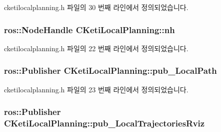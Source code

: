 cketilocalplanning.\+h 파일의 30 번째 라인에서 정의되었습니다.

\subsubsection[{\texorpdfstring{nh}{nh}}]{\setlength{\rightskip}{0pt plus 5cm}ros\+::\+Node\+Handle C\+Keti\+Local\+Planning\+::nh\hspace{0.3cm}{\ttfamily [protected]}}\hypertarget{class_c_keti_local_planning_a39a260e89fa7805f6c0c7112c91cb847}{}\label{class_c_keti_local_planning_a39a260e89fa7805f6c0c7112c91cb847}


cketilocalplanning.\+h 파일의 22 번째 라인에서 정의되었습니다.

\subsubsection[{\texorpdfstring{pub\+\_\+\+Local\+Path}{pub_LocalPath}}]{\setlength{\rightskip}{0pt plus 5cm}ros\+::\+Publisher C\+Keti\+Local\+Planning\+::pub\+\_\+\+Local\+Path\hspace{0.3cm}{\ttfamily [protected]}}\hypertarget{class_c_keti_local_planning_a42f394ae6069296e6f412eb5daa9dd3a}{}\label{class_c_keti_local_planning_a42f394ae6069296e6f412eb5daa9dd3a}


cketilocalplanning.\+h 파일의 23 번째 라인에서 정의되었습니다.

\subsubsection[{\texorpdfstring{pub\+\_\+\+Local\+Trajectories\+Rviz}{pub_LocalTrajectoriesRviz}}]{\setlength{\rightskip}{0pt plus 5cm}ros\+::\+Publisher C\+Keti\+Local\+Planning\+::pub\+\_\+\+Local\+Trajectories\+Rviz\hspace{0.3cm}{\ttfamily [protected]}}\hypertarget{class_c_keti_local_planning_a423ed1137dde91f12793bdcacb4e0bea}{}\label{class_c_keti_local_planning_a423ed1137dde91f12793bdcacb4e0bea}


